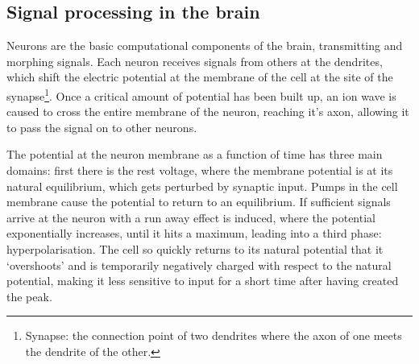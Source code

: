 \documentclass[a4paper,twocolumn]{article}
\begin{document}
\subsection{Signal processing in the brain}
Neurons are the basic computational components of the brain, transmitting and
morphing signals. Each neuron receives signals from others at the dendrites,
which shift the electric potential at the membrane of the cell at the site of
the synapse\footnote{Synapse: the connection point of two dendrites where the
axon of one meets the dendrite of the other.}. Once a critical amount of
potential has been built up, an ion wave is caused to cross the entire membrane
of the neuron, reaching it's axon, allowing it to pass the signal on to other
neurons.

The potential at the neuron membrane as a function of time has three main
domains: first there is the rest voltage, where the membrane potential is at its
natural equilibrium, which gets perturbed by synaptic input. Pumps in the cell
membrane cause the potential to return to an equilibrium. If sufficient signals
arrive at the neuron with a run away effect is induced, where the potential
exponentially increases, until it hits a maximum, leading into a third phase:
hyperpolarisation. The cell so quickly returns to its natural potential that it
`overshoots' and is temporarily negatively charged with respect to the natural
potential, making it less sensitive to input for a short time after having
created the peak.

\end{document}

